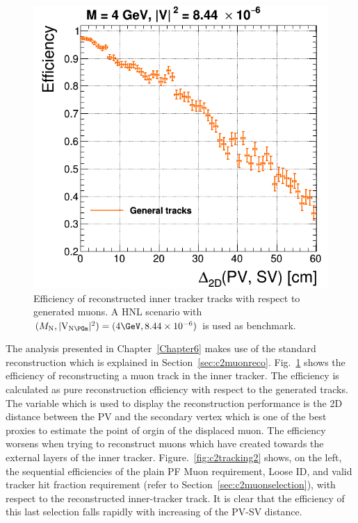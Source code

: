 \begin{figure}
\includegraphics[width=.40\textwidth]{Figures/c6/object/tracking_M-4_V-0p00290516780927_rho.png}
  \caption{Efficiency of reconstructed inner tracker tracks with
    respect to generated muons. A HNL scenario with
    $(\mhnl,\mixparm)=(4\GeV,8.44\times10^{-6})$ is used as
    benchmark. \dani}
  \label{fig:c2tracking}
\end{figure}
The analysis presented in Chapter~\ref{Chapter6} makes use of the
standard reconstruction which
 is explained in
Section~\ref{sec:c2muonreco}. 
Fig.~\ref{fig:c2tracking} shows the efficiency of
reconstructing a muon track in the inner tracker. The efficiency is
calculated as pure reconstruction efficiency with respect to the
generated tracks. The variable which is used to display the reconstruction
performance is the 2D distance between the PV and the secondary vertex
which is one of the best proxies to estimate the point of orgin of the
displaced muon. The efficiency worsens when trying to reconstruct
muons which have created towards the external layers of the inner
tracker. Figure.~\ref{fig:c2tracking2} shows, on the left, the sequential
efficiencies of the plain PF Muon requirement, Loose ID, and
valid tracker hit fraction requirement (refer to Section~\ref{sec:c2muonselection}), with respect to the reconstructed
inner-tracker track. It is clear that the efficiency of
this last selection falls rapidly with increasing of the PV-SV
distance. 

